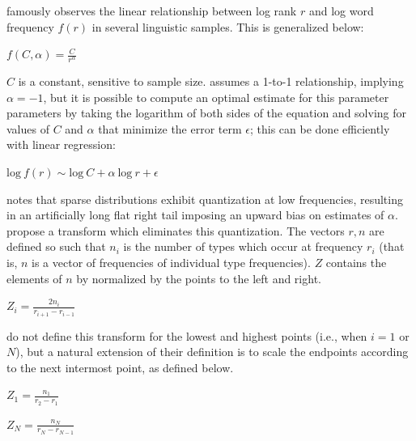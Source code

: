 \documentclass[12pt]{article}
\begin{document}
\citet{Zipf1949} famously observes the linear relationship between log rank $r$ and log word frequency $f(r)$ in several linguistic samples. This is generalized below:

\begin{unlabeledexample} 
$\displaystyle f(C, \alpha) = \frac{C}{r^\alpha}$ 
\end{unlabeledexample} 

\noindent 
$C$ is a constant, sensitive to sample size. \citeauthor{Zipf1949} assumes a 1-to-1 relationship, implying $\alpha = -1$, but it is possible to compute an optimal estimate for this parameter parameters by taking the logarithm of both sides of the equation and solving for values of $C$ and $\alpha$ that minimize the error term $\epsilon$; this can be done efficiently with linear regression:

\begin{unlabeledexample} 
$\displaystyle \textrm{log}~f(r) \sim \textrm{log}~C + \alpha~\textrm{log}~r + \epsilon$  
\end{unlabeledexample}

\citet{Good1953} notes that sparse distributions exhibit quantization at low frequencies, resulting in an artificially long flat right tail imposing an upward bias on estimates of $\alpha$. \citet[][29]{Church1991} propose a transform which eliminates this quantization. The vectors $r, n$ are defined so such that $n_i$ is the number of types which occur at frequency $r_i$ (that is, $n$ is a vector of frequencies of individual type frequencies). $Z$ contains the elements of $n$ by normalized by the points to the left and right.

\begin{unlabeledexample}
$\displaystyle Z_i = \frac{2 n_i}{r_{i + 1} - r_{i - 1}}$
\end{unlabeledexample}

\noindent \citeauthor{Church1991} do not define this transform for the lowest and highest points (i.e., when $i = 1$ or $N$), but a natural extension of their definition is to scale the endpoints according to the next intermost point, as defined below.

\begin{unlabeledexample}
$\displaystyle Z_1 = \frac{n_1}{r_2 - r_1}$
\end{unlabeledexample}

\begin{unlabeledexample}
$\displaystyle Z_N = \frac{n_N}{r_N - r_{N - 1}}$
\end{unlabeledexample}
\end{document}
